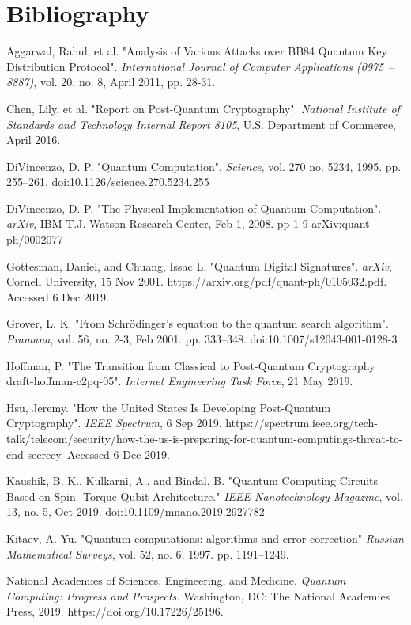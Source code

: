 \documentclass[11pt]{article}
\begin{document}
\section{Bibliography}  %
\begin{hangparas}{.25in}{1}
Aggarwal, Rahul, et al. "Analysis of Various Attacks over BB84 Quantum Key
Distribution Protocol". \textit{International Journal of Computer Applications (0975 – 8887)}, vol. 20, no. 8, April 2011, pp. 28-31. 

Chen, Lily, et al. "Report on Post-Quantum Cryptography". \textit{National Institute of Standards and Technology Internal Report 8105}, U.S. Department of Commerce, April 2016.

DiVincenzo, D. P. "Quantum Computation". \textit{Science}, vol. 270 no. 5234, 1995. pp. 255–261. doi:10.1126/science.270.5234.255 

DiVincenzo, D. P. "The Physical Implementation of Quantum Computation". \textit{arXiv},
IBM T.J. Watson Research Center, Feb 1, 2008. pp 1-9 arXiv:quant-ph/0002077

Gottesman, Daniel, and Chuang, Issac L. "Quantum Digital Signatures". \textit{arXiv}, Cornell University, 15 Nov 2001. https://arxiv.org/pdf/quant-ph/0105032.pdf. Accessed 6 Dec 2019.

Grover, L. K. "From Schrödinger’s equation to the quantum search algorithm". \textit{Pramana}, vol. 56, no. 2-3, Feb 2001. pp. 333–348. doi:10.1007/s12043-001-0128-3 

Hoffman, P. "The Transition from Classical to Post-Quantum Cryptography draft-hoffman-c2pq-05". \textit{Internet Engineering Task Force}, 21 May 2019.

Hsu, Jeremy. "How the United States Is Developing Post-Quantum Cryptography". \textit{IEEE Spectrum}, 6 Sep 2019. https://spectrum.ieee.org/tech-talk/telecom/security/how-the-us-is-preparing-for-quantum-computings-threat-to-end-secrecy. Accessed 6 Dec 2019. 

Kaushik, B. K., Kulkarni, A., and Bindal, B. "Quantum Computing Circuits Based on Spin- Torque Qubit Architecture." \textit{IEEE Nanotechnology Magazine}, vol. 13, no. 5, Oct 2019. doi:10.1109/mnano.2019.2927782 

Kitaev, A. Yu. "Quantum computations: algorithms and error correction" \textit{Russian Mathematical Surveys}, vol. 52, no. 6, 1997. pp. 1191–1249. 

National Academies of Sciences, Engineering, and Medicine. \textit{Quantum Computing: Progress and Prospects.} Washington, DC: The National Academies Press, 2019. https://doi.org/10.17226/25196. 


\end{hangparas}
\end{document}
